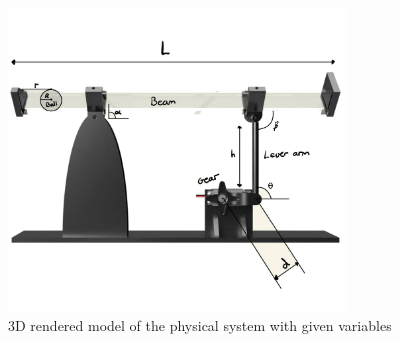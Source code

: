 \begin{figure}[h]
    \centering
    \includegraphics[width = 0.8\textwidth]{Images/3D-MAIN.png}
    \caption{3D rendered model of the physical system with given variables}
    \label{fig:3d-model}
\end{figure}

